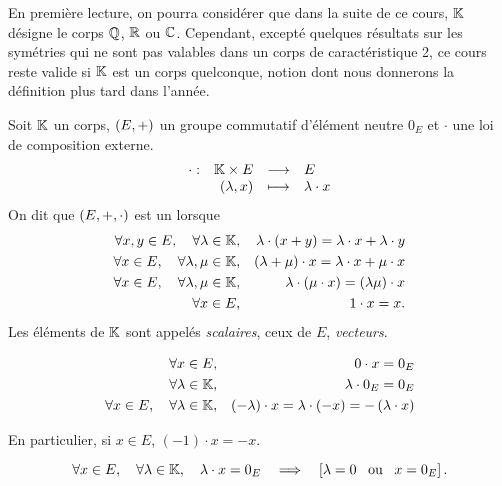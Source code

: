 \documentclass{magnoliaold}
\begin{document}
En première lecture, on pourra considérer que dans la suite de ce cours, $\mathbb{K}$ désigne le corps $\mathbb{Q}$, $\mathbb{R}$ ou
$\mathbb{C}$. Cependant, excepté quelques résultats sur les symétries qui ne sont pas valables dans
un corps de caractéristique 2, ce cours reste valide si $\mathbb{K}$ est un corps quelconque, notion
dont nous donnerons la définition plus tard dans l'année.
\vspace{2ex}

\begin{definition}[utile=-3]
Soit $\mathbb{K}$ un corps, $\left(E,+\right)$ un groupe commutatif d'élément neutre $0_E$ et
$\cdot$ une loi de composition externe.
\[\begin{array}[t]{lrcl} \displaystyle{\cdot} : & \displaystyle{\ensuremath{\mathbb{K}}\times E} & \longrightarrow & \displaystyle{E} \\ & \displaystyle{\left(\lambda,x\right)} & \longmapsto & \displaystyle{\lambda\cdot x} \end{array}\]
On dit que $\left(E,+,\cdot\right)$ est un \emph{\Kev} lorsque
\begin{eqnarray*}
\forall x,y\in E ,\quad \forall \lambda\in\mathbb{K}, & &
  \lambda\cdot\left(x+y\right)=\lambda\cdot x+\lambda\cdot y\\
\forall x\in E ,\quad \forall \lambda,\mu\in\mathbb{K}, & &
  \left(\lambda+\mu\right)\cdot x=\lambda\cdot x+\mu\cdot x\\
\forall x\in E ,\quad \forall \lambda,\mu\in\mathbb{K}, & &
  \lambda\cdot\left(\mu\cdot x\right)=\left(\lambda\mu\right)\cdot x\\
\forall x\in E, & & 1\cdot x=x.
\end{eqnarray*}
Les éléments de $\mathbb{K}$ sont appelés \emph{scalaires}, ceux de $E$, \emph{vecteurs}.
\end{definition}

\begin{proposition}[utile=-3]
\begin{eqnarray*}
\forall x\in E,& & 0\cdot x=0_E\\
\forall \lambda\in\mathbb{K}, & & \lambda\cdot 0_E=0_E\\
\forall x\in E ,\quad \forall \lambda\in\mathbb{K}, & &
  \left(-\lambda\right)\cdot x=\lambda\cdot\left(-x\right)=-\left(\lambda\cdot x\right)
\end{eqnarray*}
\end{proposition}

\begin{remarqueUnique}
\remarque[utile=-1] En particulier, si $x\in E$, $(-1)\cdot x=-x$.
\end{remarqueUnique}

\begin{proposition}[utile=1]
\[\forall x\in E ,\quad \forall \lambda\in\mathbb{K} ,\quad
  \lambda\cdot x=0_E \quad\Longrightarrow\quad \left[\lambda=0 \quad\!\text{ou}\quad\! x=0_E\right].\]  
\end{proposition}
\end{document}
